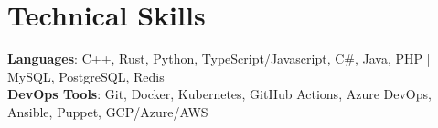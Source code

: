 \section{Technical Skills}
\begin{itemize}[leftmargin=0.15in, label={}]
    \small{\item{
        \textbf{Languages}{: C++, Rust, Python, TypeScript/Javascript, C\#, Java, PHP | MySQL, PostgreSQL, Redis} \\
        \textbf{DevOps Tools}{: Git, Docker, Kubernetes, GitHub Actions, Azure DevOps, Ansible, Puppet, GCP/Azure/AWS} \\
    }}
\end{itemize}

